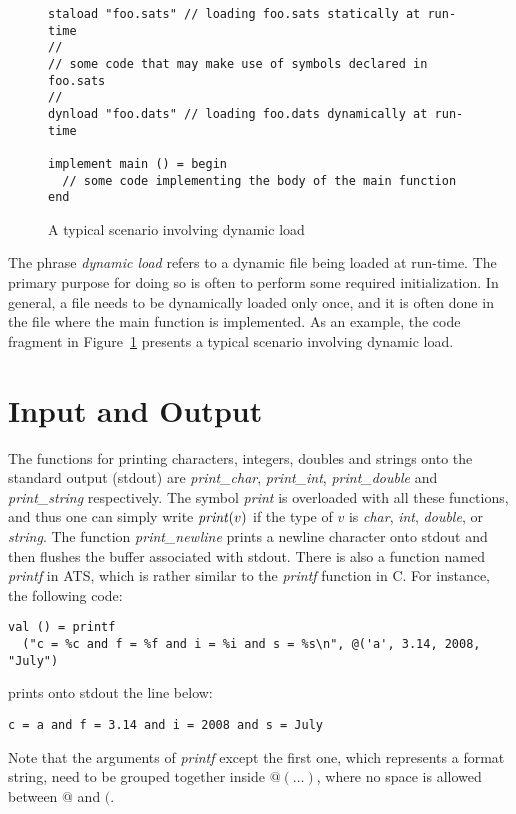 \begin{figure}[thp]
\begin{verbatim}
staload "foo.sats" // loading foo.sats statically at run-time
//
// some code that may make use of symbols declared in foo.sats
//
dynload "foo.dats" // loading foo.dats dynamically at run-time

implement main () = begin
  // some code implementing the body of the main function
end
\end{verbatim}
\caption{A typical scenario involving dynamic load}
\label{figure:dynamic_load_scenario}
\end{figure}
The phrase {\em dynamic load} refers to a dynamic file being loaded at
run-time. The primary purpose for doing so is often to perform some
required initialization. In general, a file needs to be dynamically loaded
only once, and it is often done in the file where the main function is
implemented. As an example, the code fragment in
Figure~\ref{figure:dynamic_load_scenario} presents a typical scenario involving
dynamic load.


\section{Input and Output}
The functions for printing characters, integers, doubles and strings onto
the standard output (stdout) are {\it print\_char}, {\it print\_int}, {\it
print\_double} and {\it print\_string} respectively.  The symbol {\it
print} is overloaded with all these functions, and thus one can simply
write ${\it print}(v)$ if the type of $v$ is {\it char}, {\it int}, {\it
double}, or {\it string}.  The function {\it print\_newline} prints a
newline character onto stdout and then flushes the buffer associated with
stdout. There is also a function named {\it printf} in ATS, which is rather
similar to the {\it printf} function in C. For instance, the following
code:
\begin{verbatim}
val () = printf
  ("c = %c and f = %f and i = %i and s = %s\n", @('a', 3.14, 2008, "July")
\end{verbatim}
prints onto stdout the line below:
\begin{verbatim}
c = a and f = 3.14 and i = 2008 and s = July
\end{verbatim}
Note that the arguments of {\it printf} except the first one, which
represents a format string, need to be grouped together inside $@(\ldots)$,
where no space is allowed between $@$ and $($.

